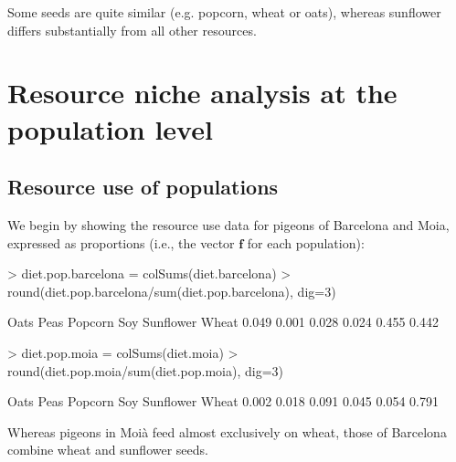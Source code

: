 \documentclass[11pt,a4paper]{article}
\begin{document}
Some seeds are quite similar (e.g. popcorn, wheat or oats), whereas sunflower differs substantially from all other resources.
\section{Resource niche analysis at the population level}
\subsection{Resource use of populations}
We begin by showing the resource use data for pigeons of Barcelona and Moia, expressed as proportions (i.e., the vector $\mathbf{f}$ for each population):
\begin{Schunk}
\begin{Sinput}
> diet.pop.barcelona = colSums(diet.barcelona)
> round(diet.pop.barcelona/sum(diet.pop.barcelona), dig=3)
\end{Sinput}
\begin{Soutput}
     Oats      Peas   Popcorn       Soy Sunflower     Wheat 
    0.049     0.001     0.028     0.024     0.455     0.442 
\end{Soutput}
\begin{Sinput}
> diet.pop.moia = colSums(diet.moia)
> round(diet.pop.moia/sum(diet.pop.moia), dig=3)
\end{Sinput}
\begin{Soutput}
     Oats      Peas   Popcorn       Soy Sunflower     Wheat 
    0.002     0.018     0.091     0.045     0.054     0.791 
\end{Soutput}
\end{Schunk}

Whereas pigeons in Moià feed almost exclusively on wheat, those of Barcelona combine wheat and sunflower seeds.
\end{document}
